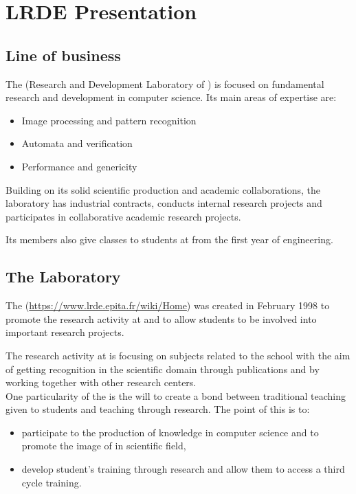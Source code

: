 \chapter{LRDE Presentation}


\section{Line of business}
The \LRDE\space (Research and Development Laboratory of \EPITA) is focused on fundamental
research and development in computer science. Its main areas of expertise are:
\begin{itemize}
 \item Image processing and pattern recognition
 \item Automata and verification
 \item Performance and genericity
\end{itemize}


\noindent Building on its solid scientific production and academic collaborations, the laboratory has
industrial contracts, conducts internal research projects and participates in collaborative
academic research projects.

\noindent Its members also give classes to students at \EPITA\space from the first year of engineering.

\section{The Laboratory}
The \LRDE\space (\url{https://www.lrde.epita.fr/wiki/Home}) was created in February 1998 to promote
the research activity at \EPITA\space and to allow students to be involved into important research
projects.

The research activity at \LRDE\space is focusing on subjects related to the school with the aim
of getting recognition in the scientific domain through publications and by working together with other
research centers.\\
One particularity of the \LRDE\space is the will to create a bond between traditional
teaching given to \EPITA\space students and teaching through research. The point of this is to:
\begin{itemize}
  \item participate to the production of knowledge in computer science and to
	promote the image of \EPITA\space in scientific field,
  \item develop \LRDE\space student's training through research and allow them to access a third cycle training.
\end{itemize}



